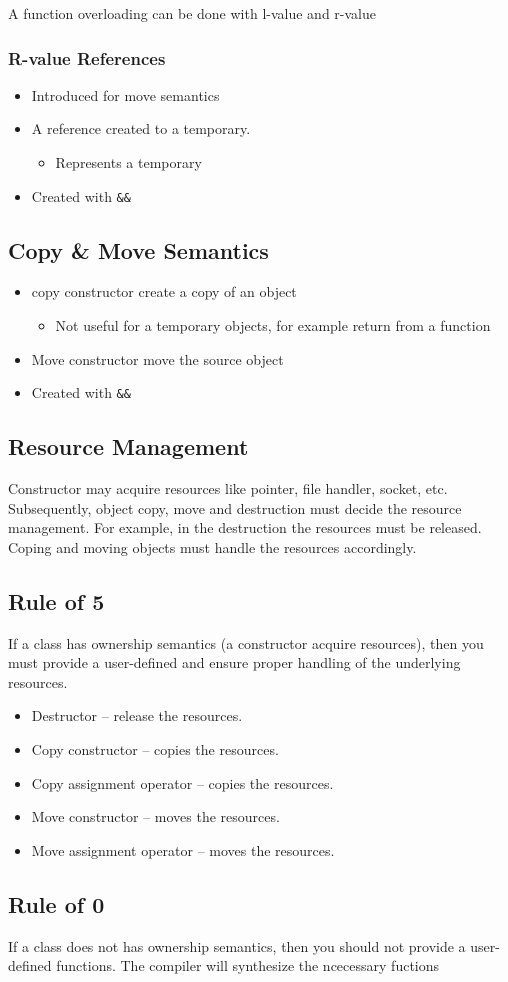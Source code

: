 A function overloading can be done with l-value and r-value

\subsubsection{R-value References} 

\begin{itemize}
    \item Introduced for move semantics
    \item A reference created to a temporary.
    \begin{itemize}
      \item Represents a temporary
    \end{itemize}
    \item Created with \texttt{\&\&}
\end{itemize}

\subsection{ Copy \& Move Semantics} 
\begin{itemize}
    \item copy constructor create a copy of an object
      \begin{itemize}
        \item Not useful for a temporary objects, for example return from a function
      \end{itemize}
    \item Move constructor move the source object
    \item Created with \texttt{\&\&}
\end{itemize}

\subsection{Resource Management} 
Constructor may acquire resources like pointer, file handler, socket, etc. 
Subsequently, object copy, move and destruction must decide the resource management.
For example, in the destruction the resources must be released. Coping and moving objects must handle the resources accordingly.

\subsection{Rule of 5} 
If a class has ownership semantics (a constructor acquire resources), then you must provide a user-defined and ensure proper handling of the underlying resources.
\begin{itemize}
  \item Destructor -- release the resources.
  \item Copy constructor -- copies the resources.
  \item Copy assignment operator -- copies the resources.
  \item Move constructor -- moves the resources.
  \item Move assignment operator -- moves the resources.
\end{itemize}

\subsection{Rule of 0}
If a class does not has ownership semantics, then you should not provide a user-defined functions. The compiler will synthesize the ncecessary fuctions
